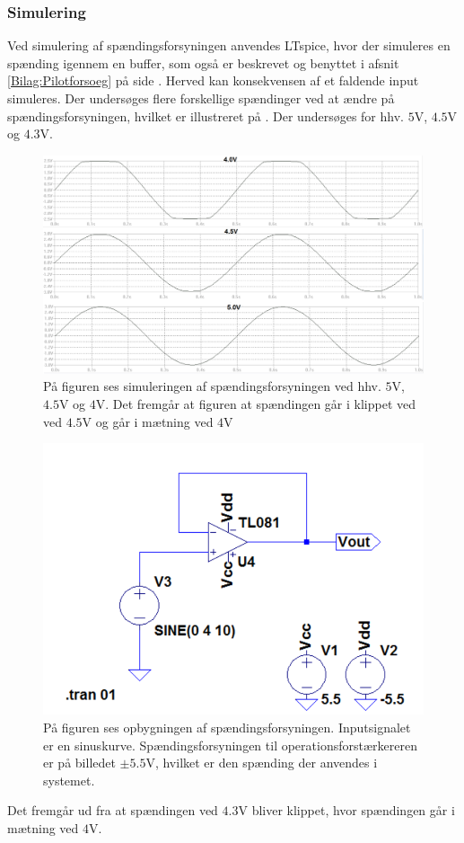 \subsubsection{Simulering}
Ved simulering af spændingsforsyningen anvendes LTspice, hvor der simuleres en spænding igennem en buffer, som også er beskrevet og benyttet i afsnit \ref{Bilag:Pilotforsoeg} på side \pageref{Bilag:Pilotforsoeg}. Herved kan konsekvensen af et faldende input simuleres. Der undersøges flere forskellige spændinger ved at ændre på spændingsforsyningen, hvilket er illustreret på . Der undersøges for hhv. $5$V, $4.5$V og $4.3$V.
\begin{figure}[H]
	\centering
	\includegraphics[scale=0.4]{figures/cProblemloesning/Spaendingsforsyning.PNG}
	\caption{På figuren ses simuleringen af spændingsforsyningen ved hhv. $5$V, $4.5$V og $4$V. Det fremgår at figuren at spændingen går i klippet ved ved $4.5$V og går i mætning ved $4$V}
	\label{fig:spaendingsforsyning_graf}
\end{figure}
\begin{figure}[H]
	\centering
	\includegraphics[scale=0.5]{figures/cProblemloesning/Spaendingsforsyning_LTspice.PNG}
	\caption{På figuren ses opbygningen af spændingsforsyningen. Inputsignalet er en sinuskurve. Spændingsforsyningen til operationsforstærkereren er på billedet $\pm5.5$V, hvilket er den spænding der anvendes i systemet.}
	\label{fig:spaendingsforsyning}
\end{figure}
Det fremgår ud fra  at spændingen ved $4.3$V bliver klippet, hvor spændingen går i mætning ved $4$V. 

